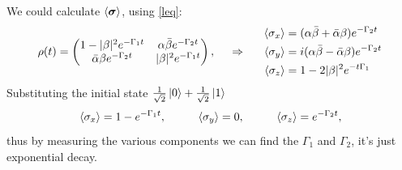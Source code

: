 We could calculate $\langle \boldsymbol{\sigma}\rangle$, using  \eqref{leq}:
\begin{equation*}
	\rho(t) = \begin{pmatrix}
	    1-|\beta|^2 e^{- \Gamma_1 t} & \alpha \bar{\beta} e^{-\Gamma_2 t} \\
	    \bar{\alpha} \beta e^{- \Gamma_2 t} & |\beta|^2 e^{-\Gamma_1 t} \\
	\end{pmatrix},
	\hspace{0.5cm} \Rightarrow \hspace{0.5cm}
	\left.\begin{aligned}
	   \langle \sigma_x\rangle &= (\alpha \bar{\beta} + \bar{\alpha} \beta ) e^{- \Gamma_2 t}\\
	   \langle \sigma_y\rangle &= i(\alpha \bar{\beta} - \bar{\alpha} \beta ) e^{- \Gamma_2 t} \\
	   \langle \sigma_z\rangle &= 1 - 2 |\beta|^2 e^{-t \Gamma_1}
	\end{aligned}\right.
\end{equation*}
Substituting the initial state $\tfrac{1}{\sqrt{2}}\left| 0 \right\rangle + \tfrac{1}{\sqrt{2}}\left| 1 \right\rangle$
\begin{equation*}
	\langle \sigma_x\rangle = 1 - e^{- \Gamma_1 t},
	\hspace{10 mm} 
	\langle \sigma_y\rangle = 0,
	\hspace{10 mm}
	\langle \sigma_z\rangle = e^{- \Gamma_2 t},
\end{equation*}
thus by measuring the various components we can find the $\Gamma_1$ and $\Gamma_2$, it's just exponential decay.

